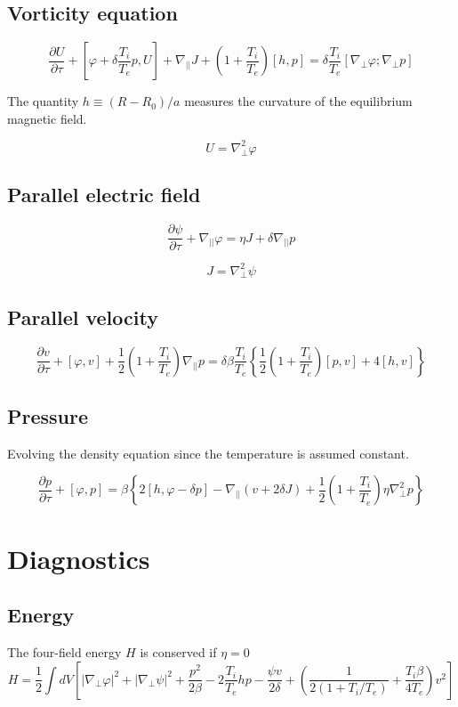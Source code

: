 \documentclass[12pt]{article}
\newcommand{\deriv}[2]{\ensuremath{\frac{\partial #1}{\partial #2}}}
\newcommand{\poisson}[2]{\ensuremath{\left[#1, #2 \right]}}
\begin{document}
\subsection{Vorticity equation}

\[
\deriv{U}{\tau} + \left[\varphi + \delta\frac{T_i}{T_e}p, U\right] + \nabla_{||}J + \left(1+\frac{T_i}{T_e}\right)\left[h, p\right] = \delta\frac{T_i}{T_e}\left[\nabla_\perp\varphi ; \nabla_\perp p\right]
\]

The quantity $h \equiv \left(R - R_0\right)/a$ measures the curvature of the 
equilibrium magnetic field. 

\[
U = \nabla_\perp^2 \varphi
\]

\subsection{Parallel electric field}

\[
\deriv{\psi}{\tau} + \nabla_{||}\varphi = \eta J + \delta\nabla_{||} p
\]

\[
J = \nabla_\perp^2 \psi
\]

\subsection{Parallel velocity}

\[
\deriv{v}{\tau} + \poisson{\varphi}{v} + \frac{1}{2}\left(1+\frac{T_i}{T_e}\right)\nabla_{||}p = \delta\beta\frac{T_i}{T_e}\left\{\frac{1}{2}\left(1+\frac{T_i}{T_e}\right)\poisson{p}{v} + 4\poisson{h}{v}\right\}
\]

\subsection{Pressure}

Evolving the density equation since the temperature is assumed constant.

\[
\deriv{p}{\tau} + \poisson{\varphi}{p} = \beta\left\{ 2\poisson{h}{\varphi - \delta p} - \nabla_{||}\left(v + 2\delta J\right) + \frac{1}{2}\left(1+\frac{T_i}{T_e}\right)\eta\nabla_\perp^2p\right\}
\]

\section{Diagnostics}

\subsection{Energy}

The four-field energy $H$ is conserved if $\eta = 0$
\[
H = \frac{1}{2}\int dV \left[ \left|\nabla_\perp\varphi\right|^2 + \left|\nabla_\perp\psi\right|^2 + \frac{p^2}{2\beta} - 2\frac{T_i}{T_e}hp - \frac{\psi v}{2\delta} + \left(\frac{1}{2\left(1+T_i/T_e\right)} + \frac{T_i\beta}{4T_e}\right)v^2\right]
\]
\end{document}
